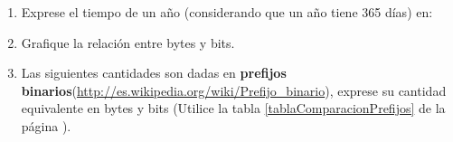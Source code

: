 \documentclass[12pt]{article}
\begin{document}
\begin{enumerate}
\begin{enumerate}

        \item Exprese el tiempo de un año (considerando que un año tiene 365
            días) en:


        \item Grafique la relación entre bytes y bits.

        \item Las siguientes cantidades son dadas en \textbf{prefijos
            binarios}(\url{http://es.wikipedia.org/wiki/Prefijo_binario}),
            exprese su cantidad equivalente en bytes y bits (Utilice la tabla
            \ref{tablaComparacionPrefijos} de la página
            \pageref{tablaComparacionPrefijos}).

\end{enumerate}
\end{enumerate}
\end{document}
